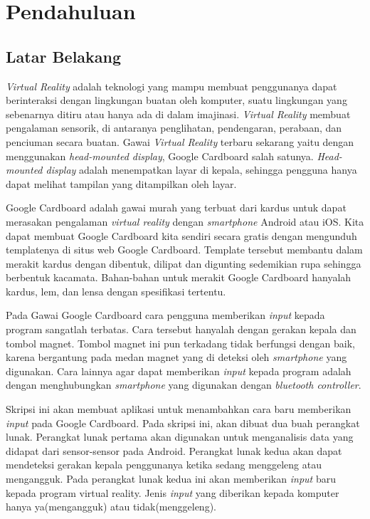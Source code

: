\chapter{Pendahuluan}
\label{chap:pendahuluan}

\section{Latar Belakang}
\label{sec:latar_belakang}

\textit{Virtual Reality} adalah teknologi yang mampu membuat penggunanya dapat berinteraksi dengan lingkungan buatan oleh komputer, suatu lingkungan yang sebenarnya ditiru atau hanya ada di dalam imajinasi.\cite{parisi_2015} \textit{Virtual Reality} membuat pengalaman sensorik, di antaranya penglihatan, pendengaran, perabaan, dan penciuman secara buatan.\cite{kim_2005} Gawai \textit{Virtual Reality} terbaru sekarang yaitu dengan menggunakan \textit{head-mounted display}, Google Cardboard salah satunya. \textit{Head-mounted display} adalah menempatkan layar di kepala, sehingga pengguna hanya dapat melihat tampilan yang ditampilkan oleh layar.\cite{vince_2004}

Google Cardboard\cite{googlevr} adalah gawai murah yang terbuat dari kardus untuk dapat merasakan pengalaman \textit{virtual reality} dengan \textit{smartphone} Android atau iOS. Kita dapat membuat Google Cardboard kita sendiri secara gratis dengan mengunduh templatenya di situs web Google Cardboard. \cite{googlevr}Template tersebut membantu dalam merakit kardus dengan dibentuk, dilipat dan digunting sedemikian rupa sehingga berbentuk kacamata. Bahan-bahan untuk merakit Google Cardboard hanyalah kardus, lem, dan lensa dengan spesifikasi tertentu.

Pada Gawai Google Cardboard cara pengguna memberikan \textit{input} kepada program sangatlah terbatas. Cara tersebut hanyalah dengan gerakan kepala dan tombol magnet. Tombol magnet ini pun terkadang tidak berfungsi dengan baik, karena bergantung pada medan magnet yang di deteksi oleh \textit{smartphone} yang digunakan. Cara lainnya agar dapat memberikan \textit{input} kepada program adalah dengan menghubungkan \textit{smartphone} yang digunakan dengan \textit{bluetooth controller}. 

Skripsi ini akan membuat aplikasi untuk menambahkan cara baru  memberikan \textit{input} pada Google Cardboard. Pada skripsi ini, akan dibuat dua buah perangkat lunak. Perangkat lunak pertama akan digunakan untuk menganalisis data yang didapat dari sensor-sensor pada Android. Perangkat lunak kedua akan dapat mendeteksi gerakan kepala penggunanya ketika sedang menggeleng atau mengangguk. Pada perangkat lunak kedua ini akan memberikan \textit{input} baru kepada program virtual reality. Jenis \textit{input} yang diberikan kepada komputer hanya ya(mengangguk) atau tidak(menggeleng).

